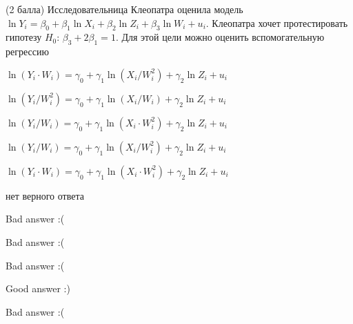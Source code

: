 
\begin{question}
(2 балла) Исследовательница Клеопатра оценила модель
\(\ln Y_i = \beta_0 + \beta_1 \ln X_i + \beta_2 \ln Z_i + \beta_3 \ln W_i + u_i\).
Клеопатра хочет протестировать гипотезу \(H_0\):
\(\beta_3 + 2\beta_1 = 1\). Для этой цели можно оценить вспомогательную
регрессию
\begin{answerlist}[2]
  \item \(\ln(Y_i \cdot W_i) = \gamma_0 + \gamma_1 \ln (X_i/W_i^2) + \gamma_2 \ln Z_i + u_i\)
  \item \(\ln(Y_i/W_i^2) = \gamma_0 + \gamma_1 \ln (X_i/W_i) + \gamma_2 \ln Z_i + u_i\)
  \item \(\ln(Y_i/W_i) = \gamma_0 + \gamma_1 \ln (X_i \cdot W_i^2) + \gamma_2 \ln Z_i + u_i\)
  \item \(\ln(Y_i/W_i) = \gamma_0 + \gamma_1 \ln(X_i/W_i^2) + \gamma_2 \ln{Z_i} + u_i\)
  \item \(\ln(Y_i \cdot W_i) = \gamma_0 + \gamma_1 \ln (X_i \cdot W_i^2) + \gamma_2 \ln Z_i + u_i\)
  \item нет верного ответа
\end{answerlist}
\end{question}

\begin{solution}
\begin{answerlist}
  \item Bad answer :(
  \item Bad answer :(
  \item Bad answer :(
  \item Good answer :)
  \item Bad answer :(
\end{answerlist}
\end{solution}
